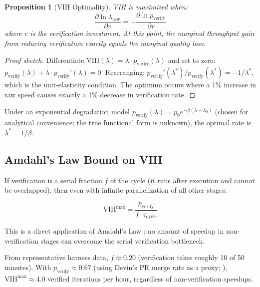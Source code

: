 \documentclass[11pt, a4paper, logo, copyright]{googledeepmind}
\newtheorem{proposition}{Proposition}[section]
\begin{document}
\begin{proposition}[VIH Optimality]
\label{prop:vih-optimal}
VIH is maximized when:
\begin{equation}
    \frac{\partial \ln \lambda_{\text{raw}}}{\partial v} = -\frac{\partial \ln p_{\text{verify}}}{\partial v}
\end{equation}
where $v$ is the verification investment. At this point, the marginal throughput gain from reducing verification exactly equals the marginal quality loss.
\end{proposition}

\begin{proof}[Proof sketch]
Differentiate $\text{VIH}(\lambda) = \lambda \cdot p_{\mathrm{verify}}(\lambda)$ and set to zero: $p_{\mathrm{verify}}(\lambda) + \lambda \cdot p_{\mathrm{verify}}'(\lambda) = 0$. Rearranging: $p_{\mathrm{verify}}'(\lambda^*)/p_{\mathrm{verify}}(\lambda^*) = -1/\lambda^*$, which is the unit-elasticity condition. The optimum occurs where a 1\% increase in raw speed causes exactly a 1\% decrease in verification rate.
\end{proof}

Under an exponential degradation model $p_{\mathrm{verify}}(\lambda) = p_0 e^{-\beta(\lambda - \lambda_0)}$ (chosen for analytical convenience; the true functional form is unknown), the optimal rate is $\lambda^* = 1/\beta$.

\subsection{Amdahl's Law Bound on VIH}

If verification is a serial fraction $f$ of the cycle (it runs after execution and cannot be overlapped), then even with infinite parallelization of all other stages:

\begin{equation}
    \text{VIH}^{\max} = \frac{p_{\text{verify}}}{f \cdot \tau_{\text{cycle}}}
\end{equation}

This is a direct application of Amdahl's Law \citep{amdahl1967validity}: no amount of speedup in non-verification stages can overcome the serial verification bottleneck.

From representative harness data, $f \approx 0.20$ (verification takes roughly 10 of 50 minutes). With $p_{\text{verify}} \approx 0.67$ (using Devin's PR merge rate as a proxy; \citealt{cognition2025devin}), $\text{VIH}^{\max} \approx 4.0$ verified iterations per hour, regardless of non-verification speedups.
\end{document}

